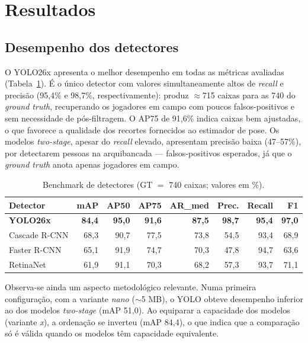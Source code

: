 \documentclass[12pt]{article}
\begin{document}
\section{Resultados}

\subsection{Desempenho dos detectores}

O YOLO26x apresenta o melhor desempenho em todas as métricas avaliadas (Tabela~\ref{tab:detector}). É o único detector com valores simultaneamente altos de \emph{recall} e precisão (95,4\% e 98,7\%, respectivamente): produz $\approx$715 caixas para as 740 do \emph{ground truth}, recuperando os jogadores em campo com poucos falsos-positivos e sem necessidade de pós-filtragem. O AP75 de 91,6\% indica caixas bem ajustadas, o que favorece a qualidade dos recortes fornecidos ao estimador de pose. Os modelos \emph{two-stage}, apesar do \emph{recall} elevado, apresentam precisão baixa (47--57\%), por detectarem pessoas na arquibancada --- falsos-positivos esperados, já que o \emph{ground truth} anota apenas jogadores em campo.

\begin{table}[ht]
\centering
\caption{Benchmark de detectores (GT $=$ 740 caixas; valores em \%).}
\label{tab:detector}
\begin{tabular}{lrrrrrrr}
\toprule
Detector & mAP & AP50 & AP75 & AR\_med & Prec. & Recall & F1 \\
\midrule
\textbf{YOLO26x} & \textbf{84,4} & \textbf{95,0} & \textbf{91,6} & \textbf{87,5} & \textbf{98,7} & \textbf{95,4} & \textbf{97,0} \\
Cascade R-CNN & 68,3 & 90,7 & 77,5 & 73,8 & 54,5 & 93,4 & 68,9 \\
Faster R-CNN & 65,1 & 91,9 & 74,7 & 70,3 & 47,8 & 94,7 & 63,6 \\
RetinaNet & 61,9 & 91,1 & 70,3 & 68,2 & 57,3 & 93,7 & 71,1 \\
\bottomrule
\end{tabular}
\end{table}

Observa-se ainda um aspecto metodológico relevante. Numa primeira configuração, com a variante \emph{nano} ($\sim$5 MB), o YOLO obteve desempenho inferior ao dos modelos \emph{two-stage} (mAP 51,0). Ao equiparar a capacidade dos modelos (variante \emph{x}), a ordenação se inverteu (mAP 84,4), o que indica que a comparação só é válida quando os modelos têm capacidade equivalente.
\end{document}

